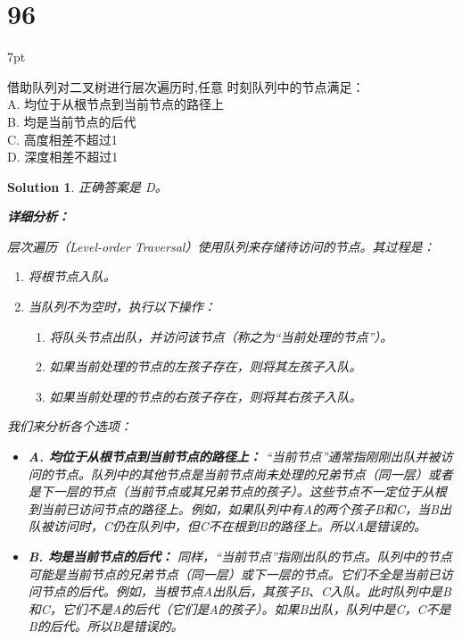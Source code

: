 \documentclass[UTF8]{report}
\newtheorem{solution}{Solution}
\theoremstyle{MyLineTheoremStyle} %
\theoremstyle{MyBlockTheoremStyle} %
\theoremstyle{MySubsubsectionStyle} %
\newenvironment{graybox}{%
        \def\FrameCommand{%
        \hspace{1pt}%
        {\color{gray}\small \vrule width 2pt}%
        {\color{graybox_color}\vrule width 4pt}%
        \colorbox{graybox_color}%
        }%
        \MakeFramed{\advance\hsize-\width\FrameRestore}%
        \noindent\hspace{-4.55pt}%
        \begin{adjustwidth}{}{7pt}%
        \vspace{2pt}\vspace{2pt}%
        }
        {%
        \vspace{2pt}\end{adjustwidth}\endMakeFramed%
        }
\begin{document}
\section*{96}
\begin{graybox}
借助队列对二叉树进行层次遍历时,任意
时刻队列中的节点满足： \\
A. 均位于从根节点到当前节点的路径上 \\
B. 均是当前节点的后代 \\
C. 高度相差不超过1 \\
D. 深度相差不超过1
\end{graybox}

\begin{solution}
正确答案是 D。

\textbf{详细分析：}

层次遍历（Level-order Traversal）使用队列来存储待访问的节点。其过程是：
\begin{enumerate}
    \item 将根节点入队。
    \item 当队列不为空时，执行以下操作：
    \begin{enumerate}
        \item 将队头节点出队，并访问该节点（称之为“当前处理的节点”）。
        \item 如果当前处理的节点的左孩子存在，则将其左孩子入队。
        \item 如果当前处理的节点的右孩子存在，则将其右孩子入队。
    \end{enumerate}
\end{enumerate}

我们来分析各个选项：

\begin{itemize}
    \item \textbf{A. 均位于从根节点到当前节点的路径上：}
        “当前节点”通常指刚刚出队并被访问的节点。队列中的其他节点是当前节点尚未处理的兄弟节点（同一层）或者是下一层的节点（当前节点或其兄弟节点的孩子）。这些节点不一定位于从根到当前已访问节点的路径上。例如，如果队列中有A的两个孩子B和C，当B出队被访问时，C仍在队列中，但C不在根到B的路径上。所以A是错误的。

    \item \textbf{B. 均是当前节点的后代：}
        同样，“当前节点”指刚出队的节点。队列中的节点可能是当前节点的兄弟节点（同一层）或下一层的节点。它们不全是当前已访问节点的后代。例如，当根节点A出队后，其孩子B、C入队。此时队列中是B和C，它们不是A的后代（它们是A的孩子）。如果B出队，队列中是C，C不是B的后代。所以B是错误的。


\end{itemize}
\end{solution}
\end{document}
